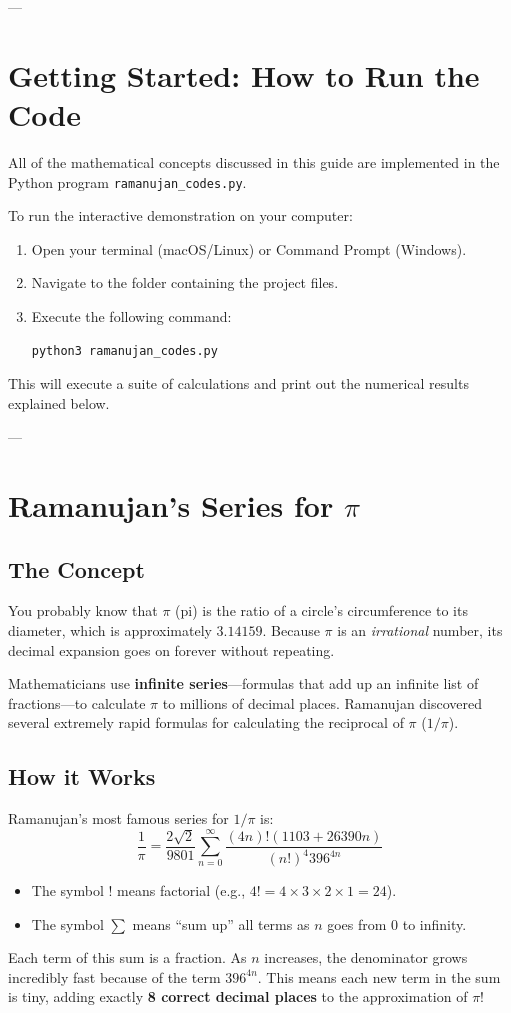 \documentclass[11pt]{article}
\begin{document}
---

\section{Getting Started: How to Run the Code}

All of the mathematical concepts discussed in this guide are implemented in the Python program \texttt{ramanujan\_codes.py}.

To run the interactive demonstration on your computer:
\begin{enumerate}
    \item Open your terminal (macOS/Linux) or Command Prompt (Windows).
    \item Navigate to the folder containing the project files.
    \item Execute the following command:
    \begin{lstlisting}[language=bash,numbers=none]
python3 ramanujan_codes.py
    \end{lstlisting}
\end{enumerate}
This will execute a suite of calculations and print out the numerical results explained below.

---

\section{Ramanujan's Series for \texorpdfstring{$\pi$}{pi}}

\subsection{The Concept}
You probably know that $\pi$ (pi) is the ratio of a circle's circumference to its diameter, which is approximately $3.14159$. Because $\pi$ is an \emph{irrational} number, its decimal expansion goes on forever without repeating.

Mathematicians use \textbf{infinite series}---formulas that add up an infinite list of fractions---to calculate $\pi$ to millions of decimal places. Ramanujan discovered several extremely rapid formulas for calculating the reciprocal of $\pi$ ($1/\pi$).

\subsection{How it Works}
Ramanujan's most famous series for $1/\pi$ is:
\[
\frac{1}{\pi} = \frac{2\sqrt{2}}{9801} \sum_{n=0}^{\infty} \frac{(4n)! (1103 + 26390n)}{(n!)^4 396^{4n}}
\]
\begin{itemize}
    \item The symbol $!$ means factorial (e.g., $4! = 4 \times 3 \times 2 \times 1 = 24$).
    \item The symbol $\sum$ means ``sum up'' all terms as $n$ goes from $0$ to infinity.
\end{itemize}
Each term of this sum is a fraction. As $n$ increases, the denominator grows incredibly fast because of the term $396^{4n}$. This means each new term in the sum is tiny, adding exactly \textbf{8 correct decimal places} to the approximation of $\pi$!
\end{document}
